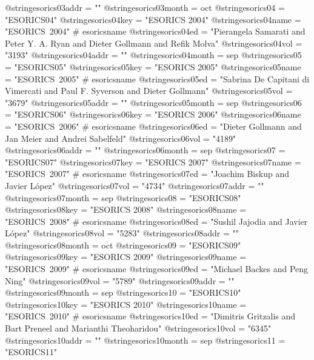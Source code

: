 @string{esorics03addr =         ""}
@string{esorics03month =        oct}
@string{esorics04 =             "ESORICS04"}
@string{esorics04key =          "ESORICS 2004"}
@string{esorics04name =         "ESORICS~2004" # esoricsname}
@string{esorics04ed =           "Pierangela Samarati and Peter Y. A. Ryan and Dieter Gollmann and Refik Molva"}
@string{esorics04vol =          "3193"}
@string{esorics04addr =         ""}
@string{esorics04month =        sep}
@string{esorics05 =             "ESORICS05"}
@string{esorics05key =          "ESORICS 2005"}
@string{esorics05name =         "ESORICS~2005" # esoricsname}
@string{esorics05ed =           "Sabrina De Capitani {di Vimercati} and Paul F. Syverson and Dieter Gollmann"}
@string{esorics05vol =          "3679"}
@string{esorics05addr =         ""}
@string{esorics05month =        sep}
@string{esorics06 =             "ESORICS06"}
@string{esorics06key =          "ESORICS 2006"}
@string{esorics06name =         "ESORICS~2006" # esoricsname}
@string{esorics06ed =           "Dieter Gollmann and Jan Meier and Andrei Sabelfeld"}
@string{esorics06vol =          "4189"}
@string{esorics06addr =         ""}
@string{esorics06month =        sep}
@string{esorics07 =             "ESORICS07"}
@string{esorics07key =          "ESORICS 2007"}
@string{esorics07name =         "ESORICS~2007" # esoricsname}
@string{esorics07ed =           "Joachim Biskup and Javier L{\'o}pez"}
@string{esorics07vol =          "4734"}
@string{esorics07addr =         ""}
@string{esorics07month =        sep}
@string{esorics08 =             "ESORICS08"}
@string{esorics08key =          "ESORICS 2008"}
@string{esorics08name =         "ESORICS~2008" # esoricsname}
@string{esorics08ed =           "Sushil Jajodia and Javier L{\'o}pez"}
@string{esorics08vol =          "5283"}
@string{esorics08addr =         ""}
@string{esorics08month =        oct}
@string{esorics09 =             "ESORICS09"}
@string{esorics09key =          "ESORICS 2009"}
@string{esorics09name =         "ESORICS~2009" # esoricsname}
@string{esorics09ed =           "Michael Backes and Peng Ning"}
@string{esorics09vol =          "5789"}
@string{esorics09addr =         ""}
@string{esorics09month =        sep}
@string{esorics10 =             "ESORICS10"}
@string{esorics10key =          "ESORICS 2010"}
@string{esorics10name =         "ESORICS~2010" # esoricsname}
@string{esorics10ed =           "Dimitris Gritzalis and Bart Preneel and Marianthi Theoharidou"}
@string{esorics10vol =          "6345"}
@string{esorics10addr =         ""}
@string{esorics10month =        sep}
@string{esorics11 =             "ESORICS11"}
